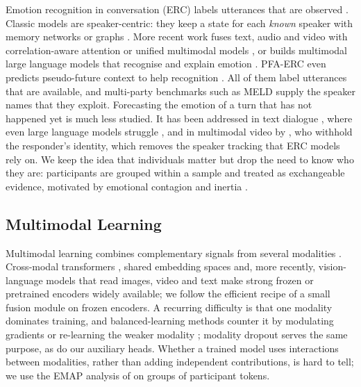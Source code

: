 \documentclass[11pt]{article}
\begin{document}
Emotion recognition in conversation (ERC) labels utterances that are observed \citep{poria2019emotion}. Classic models
are speaker-centric: they keep a state for each \emph{known} speaker with memory networks or graphs
\citep{hazarika2018icon,majumder2019dialoguernn,ghosal2019dialoguegcn,shen2021dagerc}. More recent work fuses text,
audio and video with correlation-aware attention \citep{shi2023multiemo} or unified multimodal models
\citep{hu2022unimse}, or builds multimodal large language models that recognise and explain emotion
\citep{cheng2024emotionllama,lian2025affectgpt}. PFA-ERC even
predicts pseudo-future context to help recognition \citep{khule2024pfaerc}. All of them label utterances that are
available, and multi-party benchmarks such as MELD \citep{poria2019meld} supply the speaker names that they exploit.
Forecasting the emotion of a turn that has not happened yet is much less studied. It has been addressed in text
dialogue \citep{wang2020sentiment,li2021emotion,koga2024forecasting}, where even large language models struggle
\citep{koga2024forecasting}, and in multimodal video by \citet{wang2026hief}, who withhold the responder's identity, which removes the speaker tracking
that ERC models rely on. We keep the idea that individuals matter but drop the need to know who they are: participants
are grouped within a sample and treated as exchangeable evidence, motivated by emotional contagion
\citep{hatfield1994contagion} and inertia \citep{kuppens2010inertia}.

\subsection{Multimodal Learning}

Multimodal learning combines complementary signals from several modalities \citep{baltrusaitis2019multimodal}.
Cross-modal transformers \citep{tsai2019mult}, shared embedding spaces \citep{radford2021clip,girdhar2023imagebind}
and, more recently, vision-language models that read images, video and text \citep{chen2024internvl,bai2025qwen25vl}
make strong frozen or pretrained encoders widely available; we follow the efficient recipe of a small fusion module on frozen
encoders. A recurring difficulty is that one modality dominates training, and balanced-learning methods counter it
by modulating gradients or re-learning the weaker modality \citep{wang2020makes,peng2022balanced,wei2024diagnosing};
modality dropout \citep{neverova2016moddrop} serves the same purpose, as do our auxiliary heads. Whether a trained
model uses interactions between modalities, rather than adding independent contributions, is hard to tell; we use the
EMAP analysis of \citet{hessel2020emap} on groups of participant tokens.
\end{document}
